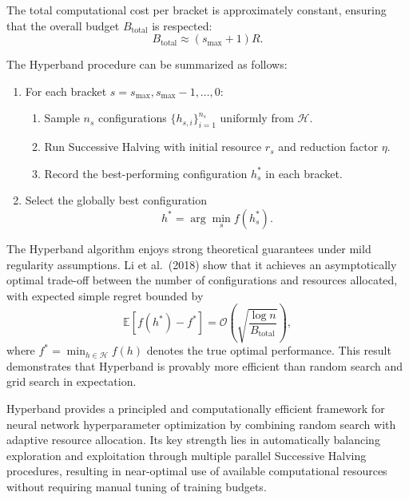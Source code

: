 The total computational cost per bracket is approximately constant, ensuring that the overall budget $B_{\text{total}}$ is respected:
\begin{equation}
	B_{\text{total}} \approx (s_{\max} + 1) R.
\end{equation}

The Hyperband procedure can be summarized as follows:
\begin{enumerate}
	\item For each bracket $s = s_{\max}, s_{\max}-1, \ldots, 0$:
	      \begin{enumerate}
		      \item Sample $n_s$ configurations $\{h_{s,i}\}_{i=1}^{n_s}$ uniformly from $\mathcal{H}$.
		      \item Run Successive Halving with initial resource $r_s$ and reduction factor $\eta$.
		      \item Record the best-performing configuration $h_s^*$ in each bracket.
	      \end{enumerate}
	\item Select the globally best configuration
	      \begin{equation}
		      h^* = \arg\min_{s} f(h_s^*).
	      \end{equation}
\end{enumerate}

The Hyperband algorithm enjoys strong theoretical guarantees under mild regularity assumptions. Li et al.\ (2018) show that it achieves an asymptotically optimal trade-off between the number of configurations and resources allocated, with expected simple regret bounded by
\begin{equation}
	\mathbb{E}\left[f(h^*) - f^*\right] = \mathcal{O}\left(\sqrt{\frac{\log n}{B_{\text{total}}}}\right),
	\label{eq:hyperband_regret}
\end{equation}
where $f^* = \min_{h \in \mathcal{H}} f(h)$ denotes the true optimal performance. This result demonstrates that Hyperband is provably more efficient than random search and grid search in expectation.

Hyperband provides a principled and computationally efficient framework for neural network hyperparameter optimization by combining random search with adaptive resource allocation. Its key strength lies in automatically balancing exploration and exploitation through multiple parallel Successive Halving procedures, resulting in near-optimal use of available computational resources without requiring manual tuning of training budgets.


